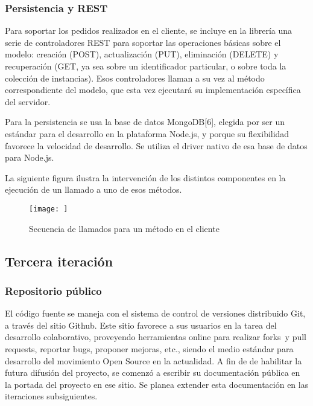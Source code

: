 \documentclass[doc,helv,longtable]{article}
\begin{document}
\subsubsection{Persistencia y REST}
Para soportar los pedidos realizados en el cliente, se incluye en la librería una serie de controladores REST para soportar las operaciones básicas sobre el modelo: creación (POST), actualización (PUT), eliminación (DELETE) y recuperación (GET, ya sea sobre un identificador particular, o sobre toda la colección de instancias). Esos controladores llaman a su vez al método correspondiente del modelo, que esta vez ejecutará su implementación específica del servidor.

Para la persistencia se usa la base de datos MongoDB[6], elegida por ser un estándar para el desarrollo en la plataforma Node.js, y porque su flexibilidad favorece la velocidad de desarrollo. Se utiliza el driver nativo de esa base de datos para Node.js\cite{nodemongo}.

La siguiente figura ilustra la intervención de los distintos componentes en la ejecución de un llamado a uno de esos métodos.

\begin{figure}[tb]
\begin{center}
\texttt{[image: ]}
\caption{Secuencia de llamados para un método en el cliente}

\end{center}
\end{figure}

\subsection{Tercera iteración}
\subsubsection{Repositorio público}
El código fuente se maneja con el sistema de control de versiones distribuido Git\cite{git}, a través del sitio Github\cite{github}. Este sitio favorece a sus usuarios en la tarea del desarrollo colaborativo, proveyendo herramientas online para realizar forks y pull requests, reportar bugs, proponer mejoras, etc., siendo el medio estándar para desarrollo del movimiento Open Source en la actualidad. A fin de de habilitar la futura difusión del proyecto, se comenzó a escribir su documentación pública en la portada del proyecto en ese sitio\cite{invisible}. Se planea extender esta documentación en las iteraciones subsiguientes.
\end{document}
